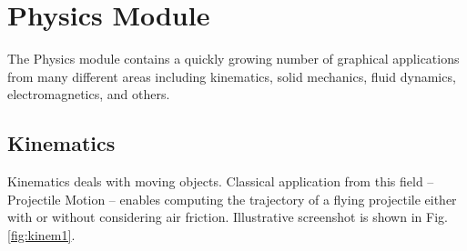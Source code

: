 \documentclass{article}
\begin{document}
%
%

\section{Physics Module}

The Physics module contains a quickly growing number of graphical applications 
from many different areas including kinematics, solid mechanics, 
fluid dynamics, electromagnetics, and others.

\subsection{Kinematics}

Kinematics deals with moving objects.  
Classical application from this field -- Projectile Motion -- enables computing 
the trajectory of a flying projectile either with or without considering 
air friction. Illustrative screenshot is shown in Fig. 
\ref{fig:kinem1}. 
\end{document}
